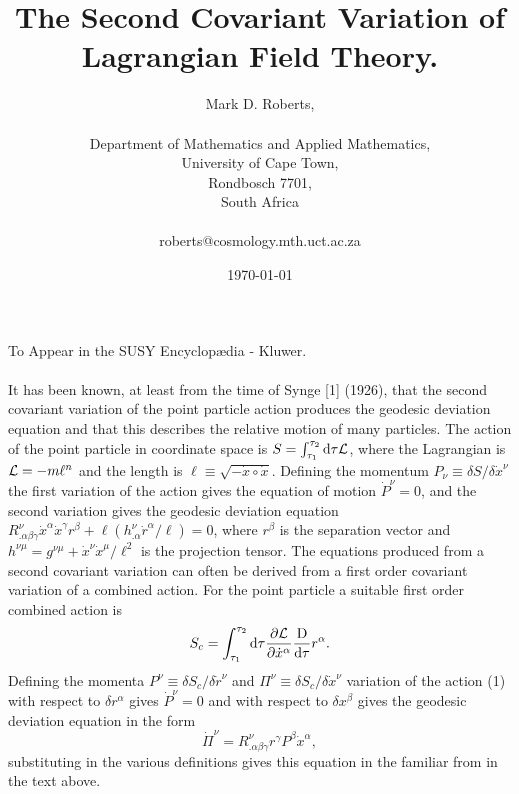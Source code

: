 \documentclass[a4paper,a4paper]{article}
\begin{document}
\title{The Second Covariant Variation of Lagrangian Field Theory.}
\author{Mark D. Roberts, \\\\
Department of Mathematics and Applied Mathematics, \\ 
University of Cape Town,\\
Rondbosch 7701,\\
South Africa\\\\
roberts@cosmology.mth.uct.ac.za} 
\date{\today}
\maketitle
To Appear in the SUSY Encyclop{\ae}dia - Kluwer.\\\\
It has been known,  at least from the time of Synge [1] (1926),
that the second covariant variation of the point particle action
produces the geodesic deviation equation and that this describes the relative
motion of many particles.   The action of the point particle in coordinate
space is 
$S=\int^{\tau_2}_{\tau_1}{\rm d}\tau{\cal{L}}$,
where the Lagrangian is 
${\cal{L}}=-m\ell^n$
and the length is
$\ell\equiv\sqrt{-\dot{x}\circ\dot{x}}$.
Defining the momentum
$P_\nu\equiv\delta S/\delta \dot{x}^\nu$
the first variation of the action gives the equation of motion
$\dot{P}^\nu=0$,
and the second variation gives the geodesic deviation equation
$R^\nu_{.\alpha\beta\gamma}\dot{x}^\alpha\dot{x}^\gamma r^\beta
+\ell(h^\nu_{.\alpha}\dot{r}^\alpha/\ell)=0$,
where $r^\beta$ is the separation vector and 
$h^{\nu\mu}=g^{\nu\mu}+\dot{x}^\nu\dot{x}^\mu/\ell^2$
is the projection tensor.   The equations produced from a second covariant
variation can often be derived from a first order covariant variation of 
a combined action.   
For the point particle a suitable first order combined action is
\begin{equation}
S_c=\int^{\tau_2}_{\tau_1}{\rm d}\tau
\frac{\partial{\cal{L}}}{\partial\dot{x}^\alpha}
\frac{{\rm D}}{{\rm d}\tau}r^\alpha.
\end{equation}
Defining the momenta
$P^\nu\equiv\delta S_c/\delta\dot{r}^\nu$
and
$\Pi^\nu\equiv\delta S_c/\delta\dot{x}^\nu$
variation of the action (1) with respect to $\delta r^\alpha$ gives 
$\dot{P}^\nu=0$ and with respect to $\delta x^\beta$ 
gives the geodesic deviation equation in the form
\begin{equation}
\dot{\Pi}^\nu=R^\nu_{.\alpha\beta\gamma}r^\gamma P^\beta\dot{x}^\alpha,
\end{equation}
substituting in the various definitions gives this equation 
in the familiar from in the text above.
\end{document}
